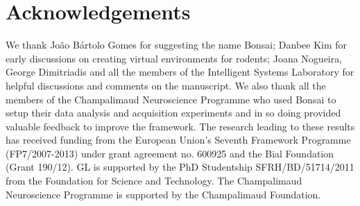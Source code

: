 \section{Acknowledgements}

We thank João Bártolo Gomes for suggesting the name Bonsai; Danbee Kim for early discussions on creating virtual environments for rodents; Joana Nogueira, George Dimitriadis and all the members of the Intelligent Systems Laboratory for helpful discussions and comments on the manuscript. We also thank all the members of the Champalimaud Neuroscience Programme who used Bonsai to setup their data analysis and acquisition experiments and in so doing provided valuable feedback to improve the framework. The research leading to these results has received funding from the European Union's Seventh Framework Programme (FP7/2007-2013) under grant agreement no. 600925 and the Bial Foundation (Grant 190/12). GL is supported by the PhD Studentship SFRH/BD/51714/2011 from the Foundation for Science and Technology. The Champalimaud Neuroscience Programme is supported by the Champalimaud Foundation.

